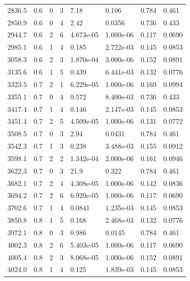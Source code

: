 \documentclass[preview]{standalone}
\begin{document}
{{{\begin{tabular}{L{1.2cm}C{1.2cm} C{0.3cm}C{0.5cm} C{1.4cm}C{1.4cm} C{1.4cm}C{1.4cm}}
  2836.5  &   0.6  & 0     &  3 &  7.18  & 0.106  & 0.784 &  0.461   \\ 
  2850.9  &   0.6  & 0     &  4 &  2.42  & 0.0356  & 0.736 &  0.433   \\ 
  2944.7  &   0.6  & 2     &  6 &  4.673e-05  & 1.000e-06  & 0.117 &  0.0690   \\ 
  2985.1  &   0.6  & 1     &  4 &  0.185  & 2.722e-03  & 0.145 &  0.0853   \\ 
  3058.3  &   0.6  & 2     &  3 &  1.870e-04  & 3.000e-06  & 0.152 &  0.0891   \\ 
  3135.6  &   0.6  & 1     &  5 &  0.439  & 6.441e-03  & 0.132 &  0.0776   \\ 
  3323.5  &   0.7  & 2     &  1 &  6.229e-05  & 1.000e-06  & 0.169 &  0.0994   \\ 
  3355.1  &   0.7  & 0     &  4 &  0.572  & 8.400e-03  & 0.736 &  0.433   \\ 
  3417.4  &   0.7  & 1     &  4 &  0.146  & 2.147e-03  & 0.145 &  0.0853   \\ 
  3451.4  &   0.7  & 2     &  5 &  4.509e-05  & 1.000e-06  & 0.131 &  0.0772   \\ 
  3508.5  &   0.7  & 0     &  3 &  2.94  & 0.0431  & 0.784 &  0.461   \\ 
  3542.3  &   0.7  & 1     &  3 &  0.238  & 3.488e-03  & 0.155 &  0.0912   \\ 
  3598.1  &   0.7  & 2     &  2 &  1.342e-04  & 2.000e-06  & 0.161 &  0.0946   \\ 
  3622.3  &   0.7  & 0     &  3 &  21.9  & 0.322  & 0.784 &  0.461   \\ 
  3682.1  &   0.7  & 2     &  4 &  4.308e-05  & 1.000e-06  & 0.142 &  0.0836   \\ 
  3694.2  &   0.7  & 2     &  6 &  6.920e-05  & 1.000e-06  & 0.117 &  0.0690   \\ 
  3702.6  &   0.7  & 1     &  4 &  0.0841  & 1.235e-03  & 0.145 &  0.0853   \\ 
  3850.8  &   0.8  & 1     &  5 &  0.168  & 2.468e-03  & 0.132 &  0.0776   \\ 
  3972.1  &   0.8  & 0     &  3 &  0.986  & 0.0145  & 0.784 &  0.461   \\ 
  4002.3  &   0.8  & 2     &  6 &  5.403e-05  & 1.000e-06  & 0.117 &  0.0690   \\ 
  4005.4  &   0.8  & 2     &  3 &  8.068e-05  & 1.000e-06  & 0.152 &  0.0891   \\ 
  4024.0  &   0.8  & 1     &  4 &  0.125  & 1.839e-03  & 0.145 &  0.0853   \\ 

\end{tabular}}}}
\end{document}

